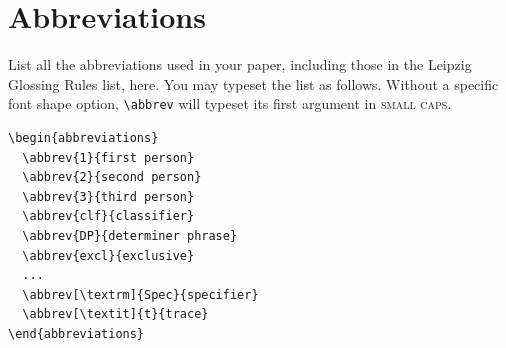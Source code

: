 \documentclass{nusaart}
\begin{document}
\section*{Abbreviations} 
List all the abbreviations used in your paper, including those in the Leipzig Glossing Rules list, here.  You may typeset the list as follows.  Without a specific font shape option, \verb|\abbrev| will typeset its first argument in \textsc{small caps}.

\begin{lstlisting}
\begin{abbreviations}
  \abbrev{1}{first person}
  \abbrev{2}{second person}
  \abbrev{3}{third person}
  \abbrev{clf}{classifier}
  \abbrev{DP}{determiner phrase}
  \abbrev{excl}{exclusive}
  ...
  \abbrev[\textrm]{Spec}{specifier}
  \abbrev[\textit]{t}{trace}
\end{abbreviations}
\end{lstlisting}
\end{document}
